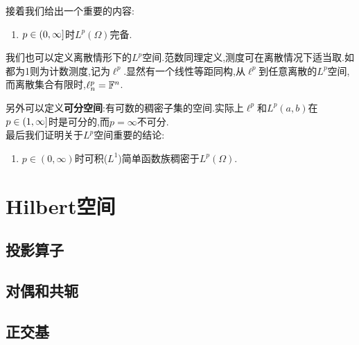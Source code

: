 \documentclass{article}
\begin{document}
接着我们给出一个重要的内容:\begin{enumerate}[resume]
    \item $p\in \left(0,\infty\right]$时$L^p(\Omega)$完备.\\
\end{enumerate}

我们也可以定义离散情形下的$L^p$空间.范数同理定义,测度可在离散情况下适当取.如都为1则为计数测度,记为$\ell^p$.显然有一个线性等距同构,从$\ell^p$到任意离散的$L^p$空间,而离散集合有限时,$\ell^p_n=\mathbb{F}^n$.

另外可以定义\textbf{可分空间}:有可数的稠密子集的空间.实际上$\ell^p$和$L^p(a,b)$在$p\in \left(1,\infty\right]$时是可分的,而$p=\infty$不可分.\tbc \\[1pt]

最后我们证明关于$L^p$空间重要的结论:\begin{enumerate}[resume]
    \item $p\in (0,\infty)$时可积($L^1$)简单函数族稠密于$L^p(\Omega)$.\\
\end{enumerate}

\section{Hilbert空间}

\subsection{投影算子}

\subsection{对偶和共轭}

\subsection{正交基}
\end{document}

